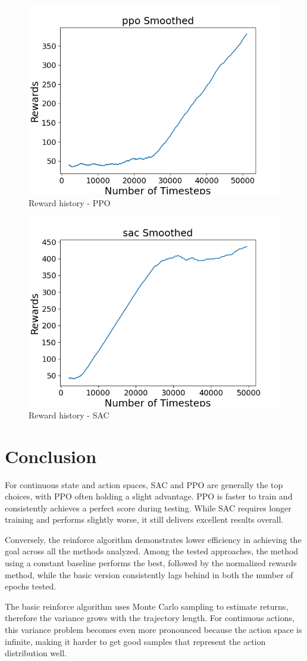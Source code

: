 \documentclass{article}
\begin{document}
\begin{figure}[h]
	\centering
	\includegraphics[width=0.5\linewidth]{../data/plot/ppo_ContinuousCartPole-v0_50k.png}
	\caption{Reward history - PPO}
	\label{fig:plot6}
\end{figure}


\begin{figure}[h]
	\centering
	\includegraphics[width=0.5\linewidth]{../data/plot/sac_ContinuousCartPole-v0_50k.png}
	\caption{Reward history - SAC}
	\label{fig:plot7}
\end{figure}

\newpage

\section{Conclusion}
For continuous state and action spaces, SAC and PPO are generally the top choices, with PPO often holding a slight advantage. PPO is faster to train and consistently achieves a perfect score during testing. While SAC requires longer training and performs slightly worse, it still delivers excellent results overall.

Conversely, the reinforce algorithm demonstrates lower efficiency in achieving the goal across all the methods analyzed. Among the tested approaches, the method using a constant baseline performs the best, followed by the normalized rewards method, while the basic version consistently lags behind in both the number of epochs tested.

The basic reinforce algorithm uses Monte Carlo sampling to estimate returns, therefore the variance grows with the trajectory length. For continuous actions, this variance problem becomes even more pronounced because the action space is infinite, making it harder to get good samples that represent the action distribution well.
\end{document}
